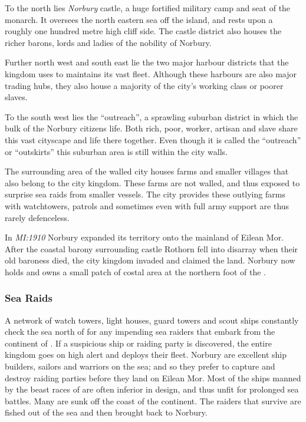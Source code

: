 To the north lies \emph{Norbury} castle, a huge fortified military camp and
seat of the monarch. It oversees the north eastern sea off the island, and
rests upon a roughly one hundred metre high cliff side. The castle district
also houses the richer barons, lords and ladies of the nobility of Norbury.

Further north west and south east lie the two major harbour districts that
the kingdom uses to maintains its vast fleet. Although these harbours are also
major trading hubs, they also house a majority of the city's working class or
poorer slaves.

To the south west lies the ``outreach'', a sprawling suburban district in which
the bulk of the Norbury citizens life. Both rich, poor, worker, artisan and
slave share this vast cityscape and life there together. Even though it is
called the ``outreach'' or ``outskirts'' this suburban area is still within
the city walls.

The surrounding area of the walled city houses farms and smaller villages that
also belong to the city kingdom. These farms are not walled, and thus
exposed to surprise sea raids from smaller vessels. The city provides these
outlying farms with watchtowers, patrols and sometimes even with full army
support are thus rarely defenceless.

In \emph{MI:1910} Norbury expanded its territory onto the mainland of Eilean
Mor. After the coastal barony surrounding castle Rothorn fell into disarray
when their old baroness died, the city kingdom invaded and claimed the land.
Norbury now holds and owns a small patch of costal area at the northern foot
of the .

\subsubsection{Sea Raids}

A network of watch towers, light houses, guard towers and scout ships
constantly check the sea north of  for any impending
sea raiders that embark from the continent of . If a
suspicious ship or raiding party is discovered, the entire kingdom goes on
high alert and deploys their fleet. Norbury are excellent ship builders,
sailors and warriors on the sea; and so they prefer to capture and destroy
raiding parties before they land on Eilean Mor. Most of the ships manned by
the beast races of  are often inferior in design, and
thus unfit for prolonged sea battles. Many are sunk off the coast of the
continent. The raiders that survive are fished out of the sea and then brought
back to Norbury.

